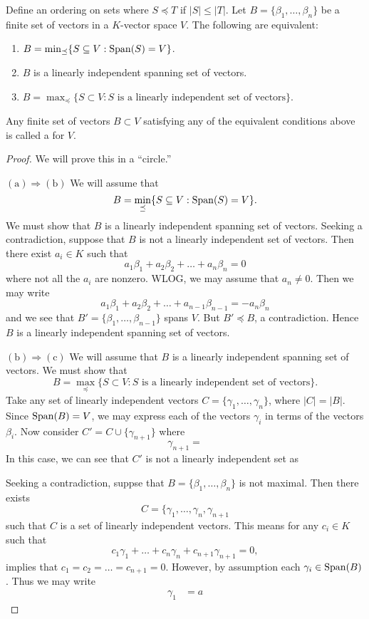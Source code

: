\documentclass{ximera}
\begin{document}
\begin{theorem}
  Define an ordering on sets where $S \preceq T$ if $|S|\le |T|$. Let
  $B= \{\beta_1,\dots,\beta_n\}$ be a finite set of vectors in a
  $K$-vector space $V$. The following are equivalent:
  \begin{enumerate}
  \item $B = \min_{\preceq}\{S\subseteq V:\operatorname{Span}(S) = V\}$.
  \item $B$ is a linearly independent spanning set of vectors.
  \item $B = \max_{\preceq}\{S\subset V:\text{$S$ is a linearly independent set of vectors}\}$.
  \end{enumerate}
  Any finite set of vectors $B \subset V$ satisfying any of the
  equivalent conditions above is called a  for $V$.
  \begin{proof}
    We will prove this in a ``circle.''

    
    $(\mathrm a)\Rightarrow(\mathrm b)$ We will assume that
    \[
    B = \min_{\preceq}\{S\subseteq V:\operatorname{Span}(S) = V\}.
    \]
    We must show that $B$ is a linearly independent spanning set of
    vectors. Seeking a contradiction, suppose that $B$ is not a
    linearly independent set of vectors. Then there exist $a_i\in K$
    such that
    \[
    a_1\beta_1 + a_2\beta_2 + \dots + a_n\beta_n = 0
    \]
    where not all the $a_i$ are nonzero. WLOG, we may assume that $a_n
    \ne 0$. Then we may write
    \[
    a_1\beta_1 + a_2\beta_2 + \dots + a_{n-1}\beta_{n-1}= -a_n \beta_n
    \]
    and we see that $B' = \{\beta_1,\dots,\beta_{n-1}\}$ spans
    $V$. But $B'\preceq B$, a contradiction. Hence $B$ is a linearly
    independent spanning set of vectors.

    

    $(\mathrm b)\Rightarrow(\mathrm c)$ We will assume that $B$ is a
    linearly independent spanning set of vectors. We must show that
    \[
    B = \max_{\preceq}\{S\subset V:\text{$S$ is a linearly independent set of vectors}\}.
    \]
    Take any set of linearly independent vectors $C =
    \{\gamma_1,\dots, \gamma_n\}$, where $|C| = |B|$. Since $\operatorname{Span}(B)
    = V$, we may express each of the vectors $\gamma_i$ in terms of
    the vectors $\beta_i$. Now consider $C'=C\cup\{\gamma_{n+1}\}$ where
    \[
    \gamma_{n+1} = 
    \]
    In this case, we can see that $C'$ is not a linearly independent
    set as
    

    Seeking a contradiction, suppse that $B=
    \{\beta_1,\dots,\beta_n\}$ is not maximal. Then there exists
    \[
    C = \{\gamma_1,\dots,\gamma_n,\gamma_{n+1}
    \]
    such that $C$ is a set of linearly independent vectors. This means
    for any $c_i\in K$ such that
    \[
    c_1\gamma_1 + \dots + c_n\gamma_n + c_{n+1}\gamma_{n+1} = 0,
    \]
    implies that $c_1 = c_2 = \dots = c_{n+1} =0$. However, by
    assumption each $\gamma_i \in \operatorname{Span}(B)$. Thus we may write
    \begin{align*}
      \gamma_1 &= a
    \end{align*}
  \end{proof}
\end{theorem}
\end{document}
